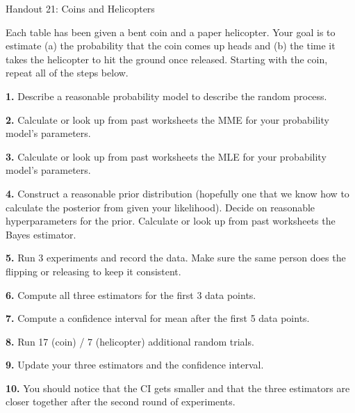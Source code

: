 \documentclass{tufte-handout}
\begin{document}
\justify

{\LARGE Handout 21: Coins and Helicopters}

\vspace*{18pt}

\noindent
Each table has been given a bent coin and a paper helicopter.
Your goal is to estimate (a) the probability that the coin comes
up heads and (b) the time it takes the helicopter to hit the
ground once released. Starting with the coin, repeat all of the
steps below.

\textbf{1.} Describe a reasonable probability model to describe
the random process.

\textbf{2.} Calculate or look up from past worksheets the MME
for your probability model's parameters.

\textbf{3.} Calculate or look up from past worksheets the MLE
for your probability model's parameters.

\textbf{4.} Construct a reasonable prior distribution (hopefully
one that we know how to calculate the posterior from given your
likelihood). Decide on reasonable hyperparameters for the prior.
Calculate or look up from past worksheets the Bayes estimator.

\textbf{5.} Run 3 experiments and record the data. Make sure the
same person does the flipping or releasing to keep it consistent.

\textbf{6.} Compute all three estimators for the first 3 data points.

\textbf{7.} Compute a confidence interval for mean after the first
5 data points.

\textbf{8.} Run 17 (coin) / 7 (helicopter) additional random trials.

\textbf{9.} Update your three estimators and the confidence interval.

\textbf{10.} You should notice that the CI gets smaller and that the
three estimators are closer together after the second round of
experiments.
\end{document}

